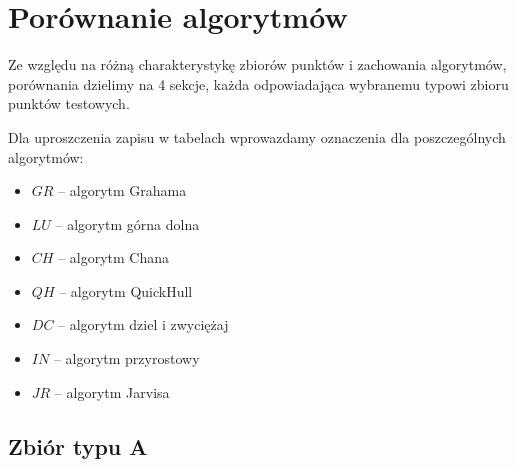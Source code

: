 \documentclass[11pt]{article}
\theoremstyle{remark} \newtheorem{definition}{def.}
\theoremstyle{definition} \newtheorem{twierdzenie}{tw.}
\begin{document}
\section{Porównanie algorytmów}

Ze względu na różną charakterystykę zbiorów punktów i zachowania algorytmów, porównania dzielimy na 4 sekcje, każda odpowiadająca wybranemu typowi zbioru punktów testowych. 

Dla uproszczenia zapisu w tabelach wprowazdamy oznaczenia dla poszczególnych algorytmów:

\begin{itemize}
    \item $GR$ -- algorytm Grahama
    \item $LU$ -- algorytm górna dolna 
    \item $CH$ -- algorytm Chana
    \item $QH$ -- algorytm QuickHull
    \item $DC$ -- algorytm dziel i zwyciężaj 
    \item $IN$ -- algorytm przyrostowy
    \item $JR$ -- algorytm Jarvisa
\end{itemize}


\subsection{Zbiór typu A}
\end{document}
